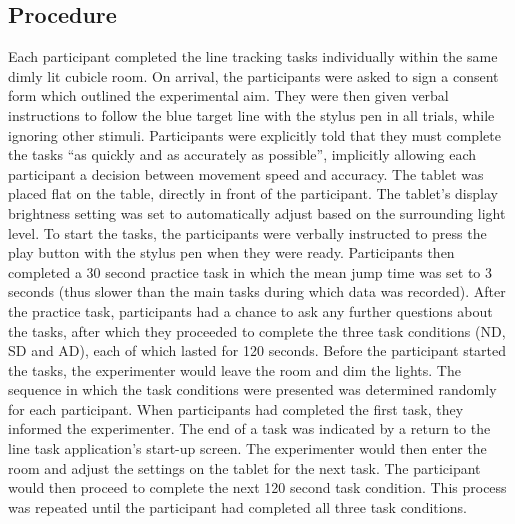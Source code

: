 \documentclass[10pt,letterpaper]{article}
\begin{document}
\subsection*{Procedure}
Each participant completed the line tracking tasks individually within
the same dimly lit cubicle room.
On arrival, the participants were asked to sign a consent form which
outlined the experimental aim. They were then given verbal
instructions to follow the blue target line with the stylus pen in all
trials, while ignoring other stimuli. Participants were explicitly
told that they must complete the tasks ``as quickly and as accurately
as possible'', implicitly allowing each participant a decision
between movement speed and accuracy.
%
The tablet was placed
flat on the table, directly in front of the participant. The tablet's
display brightness setting was set to automatically adjust based on
the surrounding light level. To start the tasks, the participants were
verbally instructed to press the play button with the stylus pen when
they were ready. Participants then completed a 30 second practice
%
task in which the mean jump time was set to 3 seconds (thus slower
than the main tasks during which data was recorded). After the
practice task, participants had a chance to ask any further questions
about the tasks, after which they proceeded to complete the three task
conditions (ND, SD and AD), each of which lasted for 120
seconds. Before the participant started the tasks, the experimenter
would leave the room and dim the lights.
The sequence in which the task conditions were presented was
determined randomly for each participant. When participants had
completed the first task, they informed the experimenter. The end of a
task was indicated by a return to the line task application's start-up
screen. The experimenter would then enter the room and adjust the
settings on the tablet for the next task. The participant would then
proceed to complete the next 120 second task condition. This process
was repeated until the participant had completed all three task
conditions.
\end{document}
